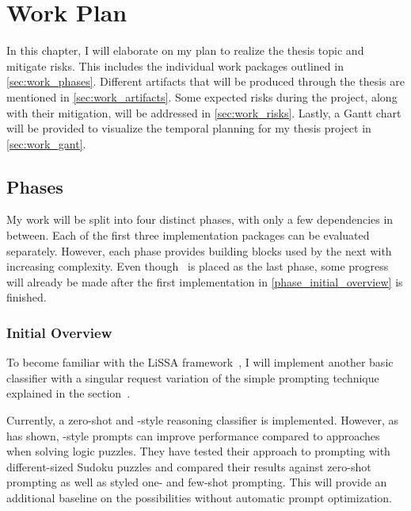 \chapter{Work Plan}
\label{chap:work_plan}

In this chapter, I will elaborate on my plan to realize the thesis topic and mitigate risks.
This includes the individual work packages outlined in \autoref{sec:work_phases}.
Different artifacts that will be produced through the thesis are mentioned in \autoref{sec:work_artifacts}.
Some expected risks during the project, along with their mitigation, will be addressed in \autoref{sec:work_risks}.
Lastly, a Gantt chart will be provided to visualize the temporal planning for my thesis project in \autoref{sec:work_gant}.

\section{Phases}
\label{sec:work_phases}

My work will be split into four distinct phases, with only a few dependencies in between.
Each of the first three implementation packages can be evaluated separately.
However, each phase provides building blocks used by the next with increasing complexity.
Even though~ is placed as the last phase, some progress will already be made after the first implementation in \autoref{phase_initial_overview} is finished.


\subsection{Initial Overview}
\label{phase_initial_overview}

To become familiar with the LiSSA framework~\cite{fuchss2025LiSSAGeneric}, I will implement another basic classifier with a singular request variation of the simple prompting technique \ToT~\cite{long2023LargeLanguage} explained in the section~.

Currently, a zero-shot and \CoT-style reasoning classifier is implemented.
However, as \citeauthor{long2023LargeLanguage} has shown, \ToT-style prompts can improve performance compared to \CoT approaches when solving logic puzzles.
They have tested their approach to \ToT prompting with different-sized Sudoku puzzles and compared their results against zero-shot prompting as well as \CoT styled one- and few-shot prompting.
This will provide an additional baseline on the possibilities without automatic prompt optimization.


